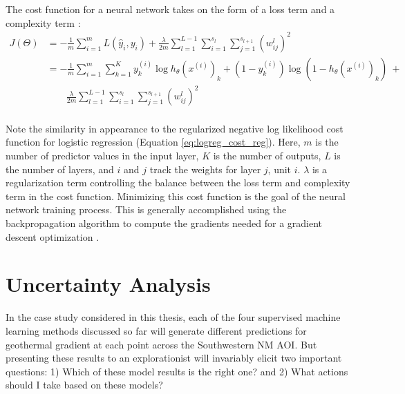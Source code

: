 The cost function for a neural network takes on the form of a loss term and a complexity term \citep{ng_neural_2011}:
\begin{equation}
\label{eq:nn_cost_function}
    \begin{aligned}
        J(\Theta) &= 
        -\frac{1}{m}\sum_{i=1}^{m}{
        L(\hat{y}_i, y_i)} + \frac{\lambda}{2m}
        \sum_{l=1}^{L-1}{
        \sum_{i=1}^{s_l}{
        \sum_{j=1}^{s_{l+1}}{(w_{ij}^{l})^2}}} \\
        &= -\frac{1}{m}
        \sum_{i=1}^{m}{
        \sum_{k=1}^{K}{
        y_k^{(i)}\log{h_{\theta}(x^{(i)})_k}+
        (1-y_k^{(i)})\log{(1-h_{\theta}(x^{(i)})_k)}}}\ + \\
        &\qquad \frac{\lambda}{2m}
        \sum_{l=1}^{L-1}{
        \sum_{i=1}^{s_l}{
        \sum_{j=1}^{s_{l+1}}{(w_{ij}^{l})^2}}}
    \end{aligned}
\end{equation}
\\
Note the similarity in appearance to the regularized negative log likelihood cost function for logistic regression (Equation \ref{eq:logreg_cost_reg}). Here, $m$ is the number of predictor values in the input layer, $K$ is the number of outputs, $L$ is the number of layers, and $i$ and $j$ track the weights for layer $j$, unit $i$. $\lambda$ is a regularization term controlling the balance between the loss term and complexity term in the cost function. Minimizing this cost function is the goal of the neural network training process. This is generally accomplished using the backpropagation algorithm to compute the gradients needed for a gradient descent optimization \citep[p.\ 396]{hastie_elements_2009}.

\section{Uncertainty Analysis}\label{ch3:uncertainty_analysis}
In the case study considered in this thesis, each of the four supervised machine learning methods discussed so far will generate different predictions for geothermal gradient at each point across the Southwestern NM AOI. But presenting these results to an explorationist will invariably elicit two important questions: 1) Which of these model results is the right one? and 2) What actions should I take based on these models? 

